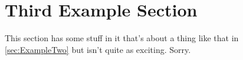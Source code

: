 
\section{Third Example Section}\label{sec:ExampleThree}

This section has some stuff in it that's about a thing like that in \autoref{sec:ExampleTwo} but isn't quite as exciting. Sorry.
